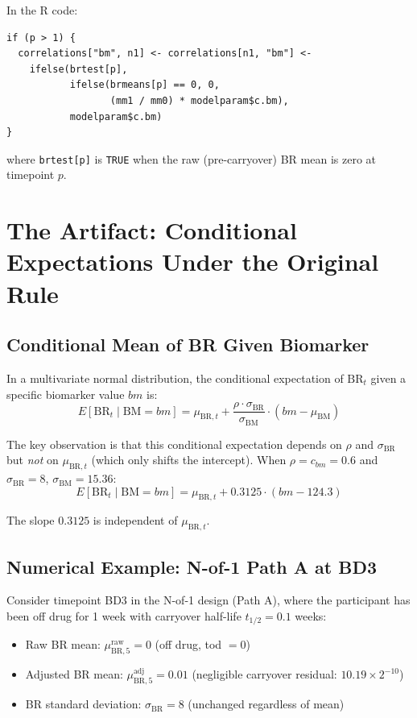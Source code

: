 \documentclass[11pt]{article}
\begin{document}
In the R code:
\begin{verbatim}
if (p > 1) {
  correlations["bm", n1] <- correlations[n1, "bm"] <-
    ifelse(brtest[p],
           ifelse(brmeans[p] == 0, 0,
                  (mm1 / mm0) * modelparam$c.bm),
           modelparam$c.bm)
}
\end{verbatim}

where \texttt{brtest[p]} is \texttt{TRUE} when the raw
(pre-carryover) BR mean is zero at timepoint $p$.

\section{The Artifact: Conditional Expectations Under the
         Original Rule}

\subsection{Conditional Mean of BR Given Biomarker}

In a multivariate normal distribution, the conditional
expectation of $\text{BR}_t$ given a specific biomarker
value $bm$ is:
\begin{equation}
E[\text{BR}_t \mid \text{BM} = bm] =
  \mu_{\text{BR},t} +
  \frac{\rho \cdot \sigma_{\text{BR}}}{\sigma_{\text{BM}}}
  \cdot (bm - \mu_{\text{BM}})
\label{eq:conditional}
\end{equation}

The key observation is that this conditional expectation
depends on $\rho$ and $\sigma_{\text{BR}}$ but \emph{not}
on $\mu_{\text{BR},t}$ (which only shifts the intercept).
When $\rho = c_{bm} = 0.6$ and $\sigma_{\text{BR}} = 8$,
$\sigma_{\text{BM}} = 15.36$:
\[
E[\text{BR}_t \mid \text{BM} = bm] =
  \mu_{\text{BR},t} + 0.3125 \cdot (bm - 124.3)
\]

The slope $0.3125$ is independent of $\mu_{\text{BR},t}$.

\subsection{Numerical Example: N-of-1 Path A at BD3}

Consider timepoint BD3 in the N-of-1 design (Path A), where the
participant has been off drug for 1 week with carryover
half-life $t_{1/2} = 0.1$ weeks:

\begin{itemize}[nosep]
\item Raw BR mean: $\mu_{\text{BR},5}^{\text{raw}} = 0$
  (off drug, tod $= 0$)
\item Adjusted BR mean: $\mu_{\text{BR},5}^{\text{adj}} = 0.01$
  (negligible carryover residual: $10.19 \times 2^{-10}$)
\item BR standard deviation: $\sigma_{\text{BR}} = 8$
  (unchanged regardless of mean)
\end{itemize}
\end{document}
